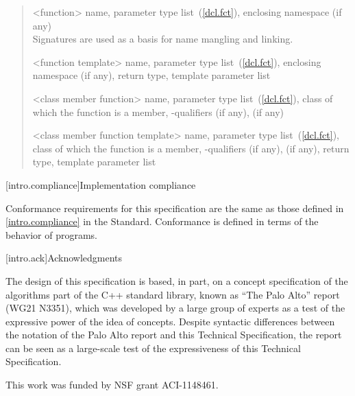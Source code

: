 \begin{quote}
%
<function> name, parameter type list~(\ref{dcl.fct}),  enclosing 
namespace (if any)\\
\enternote Signatures are used as a basis for
name mangling and linking.\exitnote

%
<function template> name, parameter type list~(\ref{dcl.fct}), enclosing namespace (if any),
return type,  template parameter list

%
<class member function> name, parameter type list~(\ref{dcl.fct}), class of which the
function is a member, \cv-qualifiers (if any),
  (if any)

%
<class member function template> name, parameter type list~(\ref{dcl.fct}), class of which the
function is a member, \cv-qualifiers (if any),
 (if any), return type,  template 
parameter list
\end{quote}

[intro.compliance]{Implementation compliance}

\pnum
Conformance requirements for this specification are the same as those 
defined in \ref{intro.compliance} in the \Cpp Standard.
\enternote 
Conformance is defined in terms of the behavior of programs.
\exitnote

[intro.ack]{Acknowledgments}

\pnum
The design of this specification is based, in part, on a concept 
specification of the algorithms part of the C++ standard library, known 
as ``The Palo Alto'' report (WG21 N3351), which was developed by a large 
group of experts as a test of the expressive power of the idea of 
concepts. Despite syntactic differences between the notation of the 
Palo Alto report and this Technical Specification, the report can be seen as a 
large-scale test of the expressiveness of this Technical Specification.

\pnum
This work was funded by NSF grant ACI-1148461.
